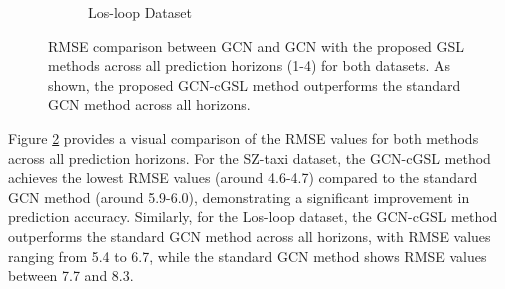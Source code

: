\documentclass[pdflatex,sn-mathphys-num]{sn-jnl}%
\theoremstyle{thmstyleone}%
\theoremstyle{thmstyletwo}%
\theoremstyle{thmstylethree}%
\begin{document}
\begin{figure}[!ht]
\begin{subfigure}{0.48\textwidth}
        \caption{Los-loop Dataset}
        \label{fig:gcn_los_loop_rmse}
    \end{subfigure}
    \caption{RMSE comparison between GCN and GCN with the proposed GSL methods across all prediction horizons (1-4) for both datasets. As shown, the proposed GCN-cGSL method  outperforms the standard GCN method across all horizons.}
    \label{fig:gcn_rmse_comparison_subfig}
  \end{figure}
    

Figure \ref{fig:gcn_rmse_comparison_subfig} provides a visual comparison of the RMSE values for both methods across all prediction horizons. For the SZ-taxi dataset, the GCN-cGSL method  achieves the lowest RMSE values (around 4.6-4.7) compared to the standard GCN method (around 5.9-6.0), demonstrating a significant improvement in prediction accuracy. Similarly, for the Los-loop dataset, the GCN-cGSL method outperforms the standard GCN method across all horizons, with RMSE values ranging from 5.4 to 6.7, while the standard GCN method shows RMSE values between 7.7 and 8.3.

\end{document}
